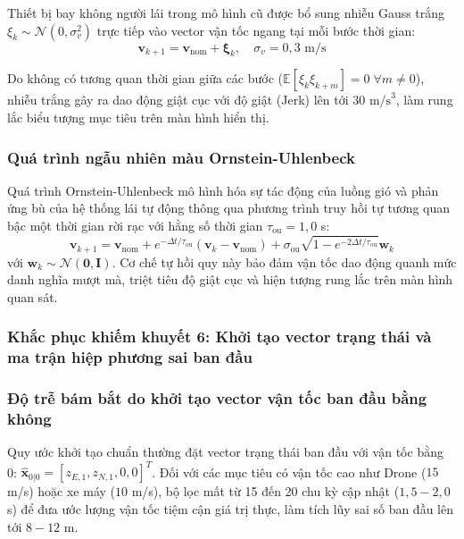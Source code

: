 \hspace{0.5cm} Thiết bị bay không người lái trong mô hình cũ được bổ sung nhiễu Gauss trắng $\xi_k \sim \mathcal{N}(0, \sigma_v^2)$ trực tiếp vào vector vận tốc ngang tại mỗi bước thời gian:
\begin{equation}
\mathbf{v}_{k+1} = \mathbf{v}_{\text{nom}} + \boldsymbol{\xi}_k, \quad \sigma_v = 0{,}3\text{ m/s}
\label{eq:white-noise-velocity-jitter}
\end{equation}

Do không có tương quan thời gian giữa các bước ($\mathbb{E}[\xi_k \xi_{k+m}] = 0 \;\forall m \ne 0$), nhiễu trắng gây ra dao động giật cục với độ giật (Jerk) lên tới $30\text{ m/s}^3$, làm rung lắc biểu tượng mục tiêu trên màn hình hiển thị.

\subsubsection{Quá trình ngẫu nhiên màu Ornstein-Uhlenbeck}

\hspace{0.5cm} Quá trình Ornstein-Uhlenbeck \cite{uhlenbeck1930brownian} mô hình hóa sự tác động của luồng gió và phản ứng bù của hệ thống lái tự động thông qua phương trình truy hồi tự tương quan bậc một thời gian rời rạc với hằng số thời gian $\tau_{\text{ou}} = 1{,}0$ s:
\begin{equation}
\mathbf{v}_{k+1} = \mathbf{v}_{\text{nom}} + e^{-\Delta t / \tau_{\text{ou}}} (\mathbf{v}_k - \mathbf{v}_{\text{nom}}) + \sigma_{\text{ou}} \sqrt{1 - e^{-2\Delta t / \tau_{\text{ou}}}} \mathbf{w}_k
\label{eq:ou-discrete-update}
\end{equation}
với $\mathbf{w}_k \sim \mathcal{N}(\mathbf{0}, \mathbf{I})$. Cơ chế tự hồi quy này bảo đảm vận tốc dao động quanh mức danh nghĩa mượt mà, triệt tiêu độ giật cục và hiện tượng rung lắc trên màn hình quan sát.


\subsubsection{Khắc phục khiếm khuyết 6: Khởi tạo vector trạng thái và ma trận hiệp phương sai ban đầu}

\subsubsection{Độ trễ bám bắt do khởi tạo vector vận tốc ban đầu bằng không}

\hspace{0.5cm} Quy ước khởi tạo chuẩn thường đặt vector trạng thái ban đầu với vận tốc bằng 0: $\hat{\mathbf{x}}_{0|0} = [z_{E, 1}, z_{N, 1}, 0, 0]^T$. Đối với các mục tiêu có vận tốc cao như Drone ($15$ m/s) hoặc xe máy ($10$ m/s), bộ lọc mất từ 15 đến 20 chu kỳ cập nhật ($1{,}5 - 2{,}0$ s) để đưa ước lượng vận tốc tiệm cận giá trị thực, làm tích lũy sai số ban đầu lên tới $8 - 12$ m.

